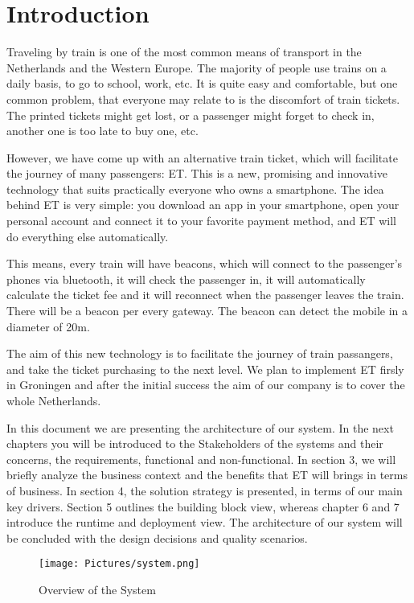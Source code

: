 \section{Introduction}
Traveling by train is one of the most common means of transport in the Netherlands and the Western Europe. The majority of people use trains on a daily basis, to go to school, work, etc. It is quite easy and comfortable, but one common problem, that everyone may relate to is the discomfort of train tickets. The printed tickets might get lost, or a passenger might forget to check in, another one is too late to buy one, etc. 

However, we have come up with an alternative train ticket, which will facilitate the journey of many passengers: \ac{ET}. This is a new, promising and innovative technology that suits practically everyone who owns a smartphone. The idea  behind \ac{ET} is very simple: you download an app in your smartphone, open your personal account and connect it to your favorite payment method, and \ac{ET} will do everything else automatically. 

This means, every train will have beacons, which will connect to the passenger’s phones via  bluetooth, it will check the passenger in,  it will automatically calculate the ticket fee and it will reconnect  when the passenger leaves the train. There will be a beacon per every gateway. The beacon can detect the mobile in a diameter of 20m.

The aim of this new technology is to facilitate the journey of train passangers, and take the ticket purchasing to the next level. We plan to implement \ac{ET} firsly in Groningen and after the initial success the aim of our company is to cover the whole Netherlands. 

In this document we are presenting the architecture of our system. In the next chapters you will be introduced to the Stakeholders of the systems and their concerns, the requirements, functional and non-functional.  In section 3, we will briefly analyze the business context and the benefits that \ac{ET} will brings in terms of business. In section 4, the solution strategy is presented, in terms of our main key drivers. Section 5 outlines the building block view, whereas chapter 6 and 7 introduce the runtime and deployment view. The architecture of our system will be concluded with the design decisions and quality scenarios. 

\begin{figure}[H]
  \centering
  \texttt{[image: Pictures/system.png]}
  \caption{Overview of the System}
  \label{fig:system}
\end{figure}

